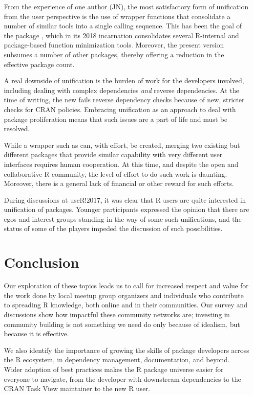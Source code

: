 From the experience of one author (JN), the most satisfactory form of
unification from the user perspective is the use of wrapper functions
that consolidate a number of similar tools into a single calling
sequence. This has been the goal of the package , which
in its 2018 incarnation consolidates several R-internal and
package-based function minimization tools. Moreover, the present version
subsumes a number of other packages, thereby offering a reduction in the
effective package count.

A real downside of unification is the burden of work for the developers
involved, including dealing with complex dependencies \emph{and} reverse
dependencies. At the time of writing, the new  fails
reverse dependency checks because of new, stricter checks for CRAN
policies. Embracing unification as an approach to deal with package
proliferation means that such issues are a part of life and must be
resolved.

While a wrapper such as  can, with effort, be created,
merging two existing but different packages that provide similar
capability with very different user interfaces requires human
cooperation. At this time, and despite the open and collaborative R
community, the level of effort to do such work is daunting. Moreover,
there is a general lack of financial or other reward for such efforts.

During discussions at useR!2017, it was clear that R users are quite
interested in unification of packages. Younger participants expressed
the opinion that there are egos and interest groups standing in the way
of some such unifications, and the status of some of the players impeded
the discussion of such possibilities.

\hypertarget{conclusion}{%
\section{Conclusion}\label{conclusion}}

Our exploration of these topics leads us to call for increased respect
and value for the work done by local meetup group organizers and
individuals who contribute to spreading R knowledge, both online and in
their communities. Our survey and discussions show how impactful these
community networks are; investing in community building is not something
we need do only because of idealism, but because it is effective.

We also identify the importance of growing the skills of package
developers across the R ecosystem, in dependency management,
documentation, and beyond. Wider adoption of best practices makes the R
package universe easier for everyone to navigate, from the developer
with downstream dependencies to the CRAN Task View maintainer to the new
R user.

